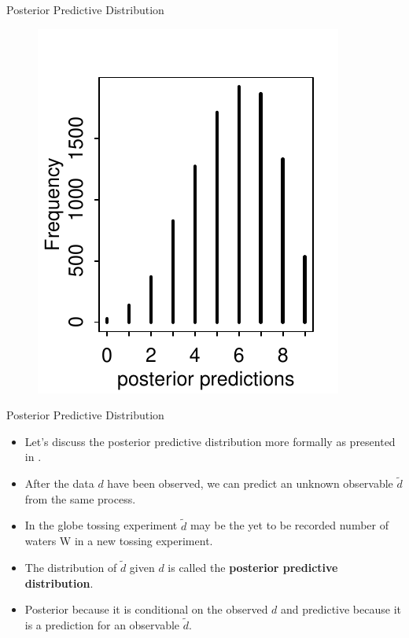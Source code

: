 \documentclass[handout]{beamer}
\begin{document}
\begin{frame}{Posterior Predictive Distribution}

   \begin{figure}[h!]
	\centering
	\includegraphics{pics/w_post_predictions.pdf}
	\end{figure} 

\end{frame}


\begin{frame}{Posterior Predictive Distribution}
\scriptsize{

\begin{itemize}

\item Let's discuss the posterior predictive distribution more formally as presented in \cite{gelman2013bayesian}.

 \item After the data $d$ have been observed, we can predict an unknown observable $\tilde{d}$ from the same process.
 
 \item In the globe tossing experiment $\tilde{d}$ may be the yet to be recorded number of waters W in a new tossing experiment.
 
 \item The distribution of  $\tilde{d}$ given $d$ is called the \textbf{posterior predictive distribution}.
 
 \item Posterior because it is conditional on the observed $d$ and predictive because it is a prediction for an observable $\tilde{d}$. 
 
 
 
\end{itemize}



} 
\end{frame}
\end{document}
